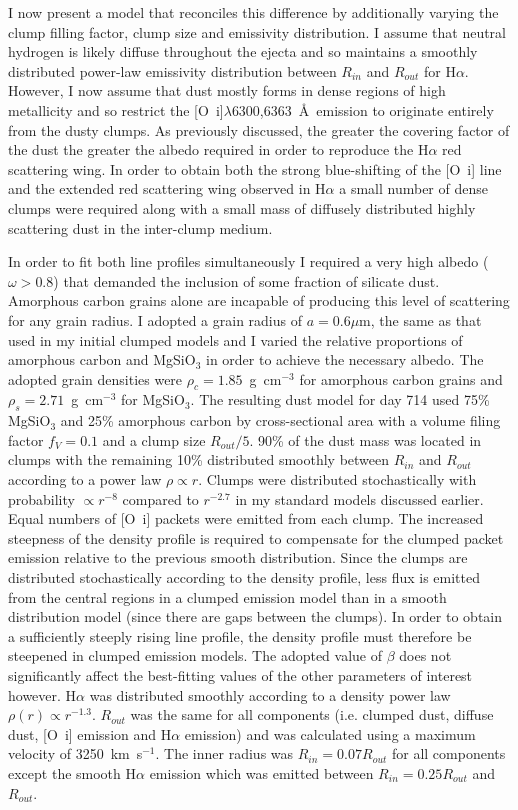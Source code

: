 I now present a model that reconciles this difference by additionally varying the clump filling factor, clump size and emissivity distribution.  I assume that neutral hydrogen is likely diffuse throughout the ejecta and so maintains a smoothly distributed power-law emissivity distribution between $R_{in}$ and $R_{out}$ for H$\alpha$.  However, I now assume that dust mostly forms in dense regions of high metallicity and so restrict the [O~{\sc i}]$\lambda$6300,6363~\AA\ emission to originate entirely from the dusty clumps.  As previously discussed, the greater the covering factor of the dust the greater the albedo required in order to reproduce the H$\alpha$ red scattering wing. In order to obtain both the strong blue-shifting of the [O~{\sc i}] line and the extended red scattering wing observed in H$\alpha$ a small number of dense clumps were required along with a small mass of diffusely distributed highly scattering dust in the inter-clump medium.


In order to fit both line profiles simultaneously I required a very high albedo ($\omega > 0.8$) that demanded the inclusion of some fraction of silicate dust. Amorphous carbon grains alone are incapable of producing this level of scattering for any grain radius.  I adopted a grain radius of $a=0.6\mu$m, the same as that used in my initial clumped models and I varied the relative proportions of amorphous carbon and MgSiO$_3$ in order to achieve the necessary albedo.  The adopted grain densities were $\rho_c=1.85$~g~cm$^{-3}$ for amorphous carbon grains and $\rho_s = 2.71$~g~cm$^{-3}$ for MgSiO$_3$.  The resulting dust model for day 714 used 75\% MgSiO$_3$ and 25\% amorphous carbon by cross-sectional area with a volume filing factor $f_V=0.1$ and a clump size $R_{out}/5$.  90\% of the dust mass was located in clumps with the remaining 10\% distributed smoothly between $R_{in}$ and $R_{out}$ according to a power law $\rho \propto r$. Clumps were distributed stochastically with probability $\propto r^{-8}$ compared to $r^{-2.7}$ in my standard models discussed earlier. Equal numbers of [O~{\sc i}] packets were emitted from each clump. The increased steepness of the density profile is required to compensate for the clumped packet emission relative to the previous smooth distribution.  Since the clumps are distributed stochastically according to the density profile, less flux is emitted from the central regions in a clumped emission model than in a smooth distribution model (since there are gaps between the clumps).  In order to obtain a sufficiently steeply rising line profile, the density profile must therefore be steepened in clumped emission models. The adopted value of $\beta$ does not significantly affect the best-fitting values of the other parameters of interest however.  H$\alpha$ was distributed smoothly according to a density power law $\rho(r) \propto r^{-1.3}$.  $R_{out}$ was the same for all components (i.e. clumped dust, diffuse dust, [O~{\sc i}] emission and H$\alpha$ emission) and was calculated using a maximum velocity of 3250~km~s$^{-1}$.  The inner radius was $R_{in} = 0.07 R_{out}$ for all components except the smooth H$\alpha$ emission which was emitted between $R_{in}=0.25R_{out}$ and $R_{out}$.  


